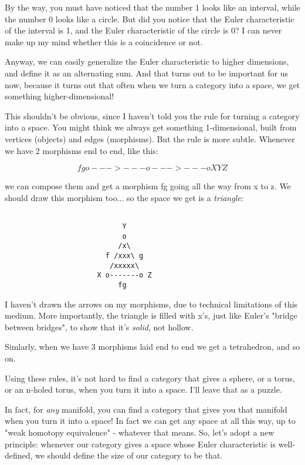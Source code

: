 By the way, you must have noticed that the number 1 looks like an
interval, while the number 0 looks like a circle.  But did you notice
that the Euler characteristic of the interval is 1, and the Euler 
characteristic of the circle is 0?  I can never make up my mind whether
this is a coincidence or not.  

Anyway, we can easily generalize the Euler characteristic to higher
dimensions, and define it as an alternating sum.  And that turns out
to be important for us now, because it turns out that often when we
turn a category into a space, we get something higher-dimensional!

This shouldn't be obvious, since I haven't told you the rule for turning 
a category into a space.  You might think we always get something 
1-dimensional, built from vertices (objects) and edges (morphisms).  
But the rule is more subtle.  Whenever we have 2 morphisms end to end, 
like this:


$$

                        f       g
                    o--->---o--->---o
                    X       Y       Z
$$
    

we can compose them and get a morphism fg going all the way from x to
z.  We should draw this morphism too... so the space we get is a
\emph{triangle}:


\begin{verbatim}

                            Y
                            o
                           /x\
                        f /xxx\ g
                         /xxxxx\
                      X o-------o Z
                           fg
\end{verbatim}
    
I haven't drawn the arrows on my morphisms, due to technical limitations 
of this medium.  More importantly, the triangle is filled with x's, just 
like Euler's "bridge between bridges", to show that it's 
\emph{solid}, not hollow.

Simlarly, when we have 3 morphisms laid end to end we get a tetrahedron,
and so on.

Using these rules, it's not hard to find a category that gives a sphere, 
or a torus, or an n-holed torus, when you turn it into a space.  I'll 
leave that as a puzzle.  


In fact, for \emph{any} manifold, you can find a category that gives
you that manifold when you turn it into a space!  In fact we can get
any space at all this way, up to "weak homotopy equivalence" -
whatever that means.  So, let's adopt a new principle: whenever our
category gives a space whose Euler characteristic is well-defined, we
should define the size of our category to be that.


